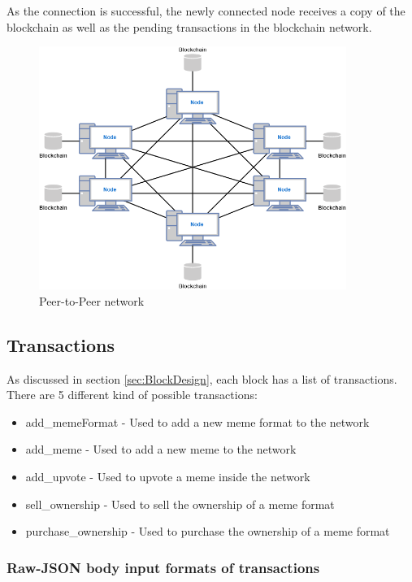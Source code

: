 \documentclass[12pt]{article}
\begin{document}
As the connection is successful, the newly connected node receives a copy of the blockchain as well as the pending transactions in the blockchain network.
\begin{figure}[H]
    \centering
    \includegraphics[width=10cm]{../report_MemeEcon/images/p2p.png}
    \caption{Peer-to-Peer network}
    \label{fig:P2P}
\end{figure}
\subsection{Transactions} %

As discussed in section \ref{sec:BlockDesign}, each block has a list of transactions. There are 5 different kind of possible transactions:
\begin{itemize}
  \item add\_memeFormat - Used to add a new meme format to the network
  \item add\_meme - Used to add a new meme to the network
  \item add\_upvote - Used to upvote a meme inside the network
  \item sell\_ownership - Used to sell the ownership of a meme format
  \item purchase\_ownership - Used to purchase the ownership of a meme format
\end{itemize}

\subsubsection{Raw-JSON body input formats of transactions}
\end{document}
